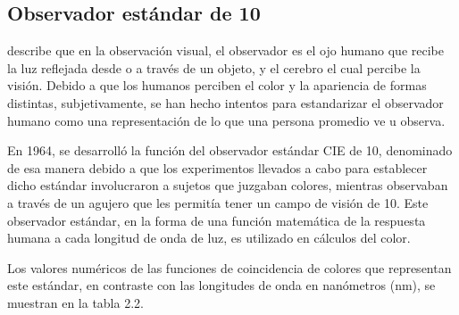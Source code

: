 	\subsection{Observador est\'{a}ndar de 10\degree}
	
		\cite{HunterLab-applications} describe que en la observaci\'{o}n visual, el observador es el ojo humano que recibe la luz reflejada desde o a trav\'{e}s de un objeto, y el cerebro el cual percibe la visi\'{o}n. Debido a que los humanos perciben el color y la apariencia de formas distintas, subjetivamente, se han hecho intentos para estandarizar el observador humano como una representaci\'{o}n de lo que una persona promedio ve u observa.
		
		En 1964, se desarroll\'{o} la funci\'{o}n del observador est\'{a}ndar CIE de 10\degree, denominado de esa manera debido a que los experimentos llevados a cabo para establecer dicho est\'{a}ndar involucraron a sujetos que juzgaban colores, mientras observaban a trav\'{e}s de un agujero que les permit\'{i}a tener un campo de visi\'{o}n de 10\degree. Este observador est\'{a}ndar, en la forma de una funci\'{o}n matem\'{a}tica de la respuesta humana a cada longitud de onda de luz, es utilizado en c\'{a}lculos del color. 
		
		Los valores num\'{e}ricos de las funciones de coincidencia de colores que representan este est\'{a}ndar, en contraste con las longitudes de onda en nan\'{o}metros (nm), se muestran en la tabla 2.2.
	
